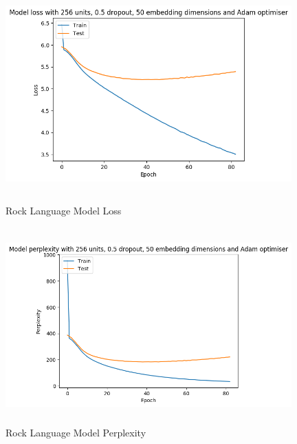 \documentclass[a4paper,11pt]{report}
\begin{document}
\begin{figure}[ht]
	\centering
	\includegraphics[width=11cm, height=7.5cm]{./figures/rockloss}
	\caption{Rock Language Model Loss}
	\label{fig:poploss}

	\includegraphics[width=11cm, height=7.5cm]{./figures/rockper}
	\caption{Rock Language Model Perplexity}
	\label{fig:popper}
\end{figure}
\end{document}
